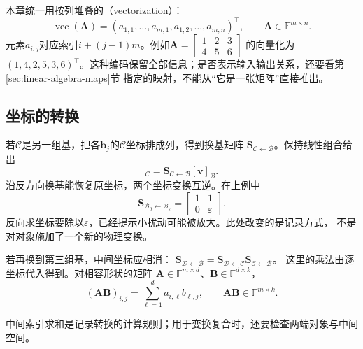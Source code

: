 本章统一用按列堆叠的（vectorization）：
\[
 \operatorname{vec}(\bm A)
 =(a_{1,1},\ldots,a_{m,1},a_{1,2},\ldots,a_{m,n})^{\top},
 \qquad \bm A\in\mathbb F^{m\times n}.
\]
元素$a_{i,j}$对应索引$i+(j-1)m$。例如$\bm A=\left[\begin{smallmatrix}1&2&3\\4&5&6\end{smallmatrix}\right]$
的向量化为$(1,4,2,5,3,6)^\top$。这种编码保留全部信息；是否表示输入输出关系，还要看第\ref{sec:linear-algebra-maps}节
指定的映射，不能从“它是一张矩阵”直接推出。

\subsection{坐标的转换}
\label{sec:linear-algebra-coordinate-conversions}
\label{sec:linear-algebra-tensors-structured-operations}

若$\mathcal C$是另一组基，把各$\bm b_j$的$\mathcal C$坐标排成列，得到换基矩阵
$\bm S_{\mathcal C\leftarrow\mathcal B}$。保持线性组合给出
\begin{equation}
 [\bm v]_{\mathcal C}
 =\bm S_{\mathcal C\leftarrow\mathcal B}[\bm v]_{\mathcal B}.
 \label{eq:linear-algebra-coordinate-change}
\end{equation}
沿反方向换基能恢复原坐标，两个坐标变换互逆。在上例中
\[
 \bm S_{\mathcal B_0\leftarrow\mathcal B_\varepsilon}
 =\begin{bmatrix}1&1\\0&\varepsilon\end{bmatrix}.
\]
反向求坐标要除以$\varepsilon$，已经提示小扰动可能被放大。此处改变的是记录方式，
不是对对象施加了一个新的物理变换。


若再换到第三组基，中间坐标应相消：
$\bm S_{\mathcal D\leftarrow\mathcal B}
=\bm S_{\mathcal D\leftarrow\mathcal C}\bm S_{\mathcal C\leftarrow\mathcal B}$。
这里的乘法由逐坐标代入得到。对相容形状的矩阵
$\bm A\in\mathbb F^{m\times d}$、$\bm B\in\mathbb F^{d\times k}$，
\begin{equation}
 (\bm A\bm B)_{i,j}=\sum_{\ell=1}^d a_{i,\ell}b_{\ell,j},
 \qquad \bm A\bm B\in\mathbb F^{m\times k}.
 \label{eq:linear-algebra-matrix-product}
\end{equation}


中间索引求和是记录转换的计算规则；用于变换复合时，还要检查两端对象与中间空间。

